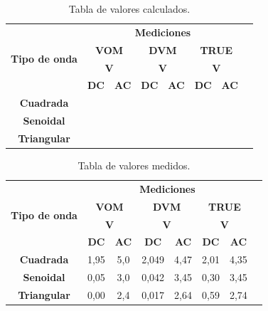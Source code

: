 \documentclass{article}
\begin{document}
\newpage
\begin{table}[!hbt]
	\begin{center}

		\begin{tabular}{|c|c|c|c|c|c|c|c|} \hline
			\multirow{4}{*}{\textbf{Tipo de onda}}

			& \multicolumn{6}{c|}{\textbf{Mediciones}} \\\cline{2-7}
			& \multicolumn{2}{c|}{\textbf{VOM}} & \multicolumn{2}{c|}{\textbf{DVM}} & \multicolumn{2}{c|}{\textbf{TRUE}} \\\cline{2-7}
			& \multicolumn{2}{c|}{\textbf{V}} & \multicolumn{2}{c|}{\textbf{V}} & \multicolumn{2}{c|}{\textbf{V}} \\\cline{2-7}
			& \textbf{DC} & \textbf{AC} & \textbf{DC} & \textbf{AC} & \textbf{DC} & \textbf{AC} \\\hline
			\textbf{Cuadrada} &  &  &  &  &  &  \\\hline
			\textbf{Senoidal} &  &  &  &  &  &  \\\hline
			\textbf{Triangular} &  &  &  &  &  &  \\\hline
		\end{tabular}

	\caption{Tabla de valores calculados.}
	\end{center}
\end{table}
\bigskip


\begin{table}[!hbt]
	\begin{center}

		\begin{tabular}{|c|c|c|c|c|c|c|c|} \hline
			\multirow{4}{*}{\textbf{Tipo de onda}}

			& \multicolumn{6}{c|}{\textbf{Mediciones}} \\\cline{2-7}
			& \multicolumn{2}{c|}{\textbf{VOM}} & \multicolumn{2}{c|}{\textbf{DVM}} & \multicolumn{2}{c|}{\textbf{TRUE}} \\\cline{2-7}
			& \multicolumn{2}{c|}{\textbf{V}} & \multicolumn{2}{c|}{\textbf{V}} & \multicolumn{2}{c|}{\textbf{V}} \\\cline{2-7}
			& \textbf{DC} & \textbf{AC} & \textbf{DC} & \textbf{AC} & \textbf{DC} & \textbf{AC} \\\hline
			\textbf{Cuadrada} & 1,95 & 5,0 & 2,049 & 4,47 & 2,01 & 4,35 \\\hline
			\textbf{Senoidal} & 0,05 & 3,0 & 0,042 & 3,45 & 0,30 & 3,45 \\\hline
			\textbf{Triangular} & 0,00 & 2,4 & 0,017 & 2,64 & 0,59 & 2,74 \\\hline
		\end{tabular}

	\caption{Tabla de valores medidos.}
	\end{center}
\end{table}
\bigskip
\end{document}

